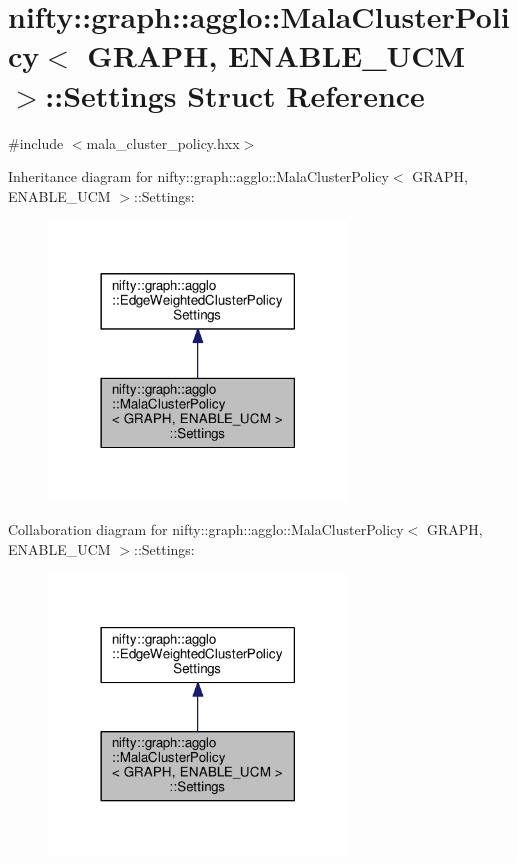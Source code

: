 \hypertarget{structnifty_1_1graph_1_1agglo_1_1MalaClusterPolicy_1_1Settings}{}\section{nifty\+:\+:graph\+:\+:agglo\+:\+:Mala\+Cluster\+Policy$<$ G\+R\+A\+P\+H, E\+N\+A\+B\+L\+E\+\_\+\+U\+C\+M $>$\+:\+:Settings Struct Reference}
\label{structnifty_1_1graph_1_1agglo_1_1MalaClusterPolicy_1_1Settings}


{\ttfamily \#include $<$mala\+\_\+cluster\+\_\+policy.\+hxx$>$}



Inheritance diagram for nifty\+:\+:graph\+:\+:agglo\+:\+:Mala\+Cluster\+Policy$<$ G\+R\+A\+P\+H, E\+N\+A\+B\+L\+E\+\_\+\+U\+C\+M $>$\+:\+:Settings\+:\nopagebreak
\begin{figure}[H]
\begin{center}
\leavevmode
\includegraphics[width=225pt]{structnifty_1_1graph_1_1agglo_1_1MalaClusterPolicy_1_1Settings__inherit__graph}
\end{center}
\end{figure}


Collaboration diagram for nifty\+:\+:graph\+:\+:agglo\+:\+:Mala\+Cluster\+Policy$<$ G\+R\+A\+P\+H, E\+N\+A\+B\+L\+E\+\_\+\+U\+C\+M $>$\+:\+:Settings\+:\nopagebreak
\begin{figure}[H]
\begin{center}
\leavevmode
\includegraphics[width=225pt]{structnifty_1_1graph_1_1agglo_1_1MalaClusterPolicy_1_1Settings__coll__graph}
\end{center}
\end{figure}
